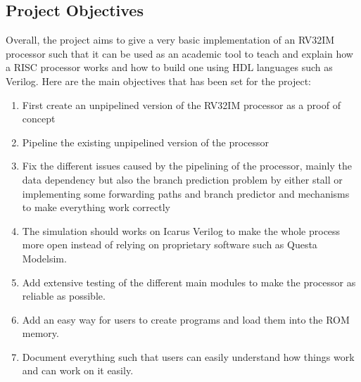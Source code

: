 \subsection{Project Objectives}

Overall, the project aims to give a very basic implementation of an RV32IM processor such 
that it can be used as an academic tool to teach and explain how a RISC processor works 
and how to build one using HDL languages such as Verilog. Here are the main objectives that 
has been set for the project:

\begin{enumerate}[label={\textbullet}]
    \item First create an unpipelined version of the RV32IM processor as a proof of concept
    \item Pipeline the existing unpipelined version of the processor
    \item Fix the different issues caused by the pipelining of the processor, mainly the 
    data dependency but also the branch prediction problem by either stall or implementing some 
    forwarding paths and branch predictor and mechanisms to make everything work correctly
    \item The simulation should works on Icarus Verilog to make the whole process more open instead 
    of relying on proprietary software such as Questa Modelsim.
    \item Add extensive testing of the different main modules to make the processor as reliable 
    as possible.
    \item Add an easy way for users to create programs and load them into the ROM memory.
    \item Document everything such that users can easily understand how things work and can 
    work on it easily.
\end{enumerate}